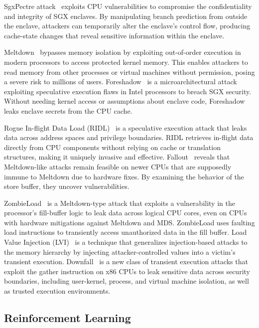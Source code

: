 SgxPectre attack~\cite{chen2019sgxpectre} exploits CPU vulnerabilities to compromise the confidentiality and integrity of SGX enclaves. By manipulating branch prediction from outside the enclave, attackers can temporarily alter the enclave's control flow, producing cache-state changes that reveal sensitive information within the enclave.

Meltdown~\cite{Lipp2018meltdown} bypasses memory isolation by exploiting out-of-order execution in modern processors to access protected kernel memory. This enables attackers to read memory from other processes or virtual machines without permission, posing a severe risk to millions of users. Foreshadow~\cite{vanbulck2018foreshadow} is a microarchitectural attack exploiting speculative execution flaws in Intel processors to breach SGX security. Without needing kernel access or assumptions about enclave code, Foreshadow leaks enclave secrets from the CPU cache.

Rogue In-flight Data Load (RIDL)~\cite{van2019ridl} is a speculative execution attack that leaks data across address spaces and privilege boundaries. RIDL retrieves in-flight data directly from CPU components without relying on cache or translation structures, making it uniquely invasive and effective. Fallout~\cite{canella2019fallout} reveals that Meltdown-like attacks remain feasible on newer CPUs that are supposedly immune to Meltdown due to hardware fixes. By examining the behavior of the store buffer, they uncover vulnerabilities.

ZombieLoad~\cite{Schwarz2019ZombieLoad} is a Meltdown-type attack that exploits a vulnerability in the processor’s fill-buffer logic to leak data across logical CPU cores, even on CPUs with hardware mitigations against Meltdown and MDS. ZombieLoad uses faulting load instructions to transiently access unauthorized data in the fill buffer. Load Value Injection (LVI)~\cite{van2020lvi} is a technique that generalizes injection-based attacks to the memory hierarchy by injecting attacker-controlled values into a victim’s transient execution. Downfall~\cite{moghimi2023downfall} is a new class of transient execution attacks that exploit the gather instruction on x86 CPUs to leak sensitive data across security boundaries, including user-kernel, process, and virtual machine isolation, as well as trusted execution environments.

\subsection{Reinforcement Learning}

